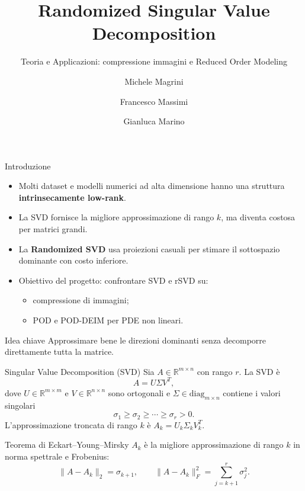 \documentclass[10pt,aspectratio=169,handout]{beamer}
\title[Randomized SVD]{Randomized Singular Value Decomposition}
\subtitle{Teoria e Applicazioni: compressione immagini e Reduced Order Modeling}
\author{Michele Magrini \and Francesco Massimi \and Gianluca Marino}
\institute{Data Mining - Matematica Applicata}
\date{}
\begin{document}
\begin{frame}
  \titlepage
\end{frame}

\begin{frame}{Introduzione}
\begin{itemize}
  \item Molti dataset e modelli numerici ad alta dimensione hanno una struttura \textbf{intrinsecamente low-rank}.
  \item La SVD fornisce la migliore approssimazione di rango $k$, ma diventa costosa per matrici grandi.
  \item La \textbf{Randomized SVD} usa proiezioni casuali per stimare il sottospazio dominante con costo inferiore.
  \item Obiettivo del progetto: confrontare SVD e rSVD su:
  \begin{itemize}
    \item compressione di immagini;
    \item POD e POD-DEIM per PDE non lineari.
  \end{itemize}
\end{itemize}
\vspace{0.2cm}
\begin{block}{Idea chiave}
Approssimare bene le direzioni dominanti senza decomporre direttamente tutta la matrice.
\end{block}
\end{frame}

\begin{frame}{Singular Value Decomposition (SVD)}
Sia $A\in\mathbb{R}^{m\times n}$ con rango $r$. La SVD è
\[
A = U\Sigma V^T,
\]
dove $U \in \mathbb{R}^{m\times m}$ e $V \in \mathbb{R}^{n\times n}$ sono ortogonali e $\Sigma \in \text{diag}_{m\times n}$ contiene i valori singolari
\[
\sigma_1\geq\sigma_2\geq\cdots\geq\sigma_r>0.
\]
\pause
L'approssimazione troncata di rango $k$ è
$A_k = U_k\Sigma_k V_k^T.$
\begin{block}{Teorema di Eckart--Young--Mirsky}
$A_k$ è la migliore approssimazione di rango $k$ in norma spettrale e Frobenius:
\[
\|A-A_k\|_2=\sigma_{k+1}, \qquad
\|A-A_k\|_F^2=\sum_{j=k+1}^{r}\sigma_j^2.
\]
\end{block}
\end{frame}
\end{document}
